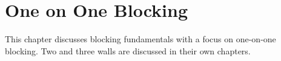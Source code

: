 \chapter{One on One Blocking}

This chapter discusses blocking fundamentals with a focus on one-on-one blocking. Two and three walls are discussed in their own chapters.

